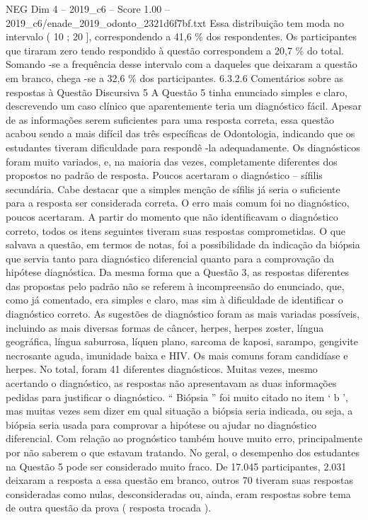 \begin{textsample}{NEG Dim 4 – 2019\_c6 – Score 1.00 – 2019\_c6/enade\_2019\_odonto\_2321d6f7bf.txt}
Essa distribuição tem moda no intervalo ( 10 ; 20 ], correspondendo a 41,6 \% dos respondentes.
Os participantes que tiraram zero tendo respondido à questão correspondem a 20,7 \% do total.
Somando -se a frequência desse intervalo com a daqueles que deixaram a questão em branco, chega -se a 32,6 \% dos participantes. 6.3.2.6 Comentários sobre as respostas à Questão Discursiva 5 A Questão 5 tinha enunciado simples e claro, descrevendo um caso clínico que aparentemente teria um diagnóstico fácil.
Apesar de as informações serem suficientes para uma resposta correta, essa questão acabou sendo a mais difícil das três específicas de Odontologia, indicando que os estudantes tiveram dificuldade para respondê -la adequadamente.
Os diagnósticos foram muito variados, e, na maioria das vezes, completamente diferentes dos propostos no padrão de resposta.
Poucos acertaram o diagnóstico – sífilis secundária.
Cabe destacar que a simples menção de sífilis já seria o suficiente para a resposta ser considerada correta.
O erro mais comum foi no diagnóstico, poucos acertaram.
A partir do momento que não identificavam o diagnóstico correto, todos os itens seguintes tiveram suas respostas comprometidas.
O que salvava a questão, em termos de notas, foi a possibilidade da indicação da biópsia que servia tanto para diagnóstico diferencial quanto para a comprovação da hipótese diagnóstica.
Da mesma forma que a Questão 3, as respostas diferentes das propostas pelo padrão não se referem à incompreensão do enunciado, que, como já comentado, era simples e claro, mas sim à dificuldade de identificar o diagnóstico correto.
As sugestões de diagnóstico foram as mais variadas possíveis, incluindo as mais diversas formas de câncer, herpes, herpes zoster, língua geográfica, língua saburrosa, líquen plano, sarcoma de kaposi, sarampo, gengivite necrosante aguda, imunidade baixa e HIV.
Os mais comuns foram candidíase e herpes.
No total, foram 41 diferentes diagnósticos.
Muitas vezes, mesmo acertando o diagnóstico, as respostas não apresentavam as duas informações pedidas para justificar o diagnóstico. “ Biópsia ” foi muito citado no item ‘ b ’, mas muitas vezes sem dizer em qual situação a biópsia seria indicada, ou seja, a biópsia seria usada para comprovar a hipótese ou ajudar no diagnóstico diferencial.
Com relação ao prognóstico também houve muito erro, principalmente por não saberem o que estavam tratando.
No geral, o desempenho dos estudantes na Questão 5 pode ser considerado muito fraco.
De 17.045 participantes, 2.031 deixaram a resposta a essa questão em branco, outros 70 tiveram suas respostas consideradas como nulas, desconsideradas ou, ainda, eram respostas sobre tema de outra questão da prova ( resposta trocada ).

\end{textsample}
